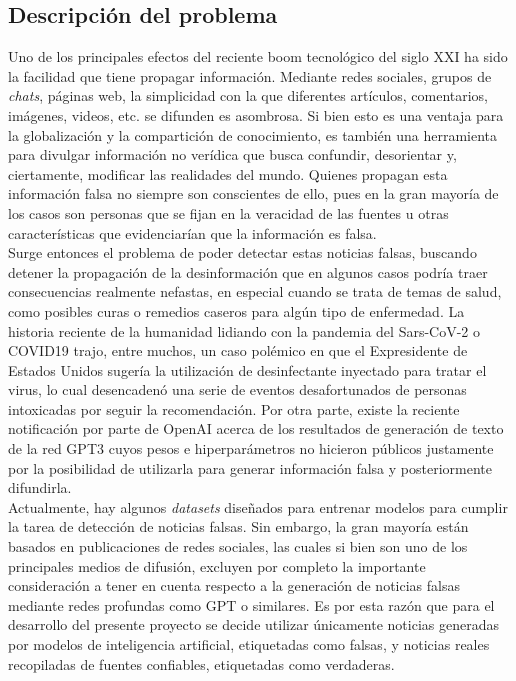 \subsection{Descripción del problema}
Uno de los principales efectos del reciente boom tecnológico del siglo XXI ha sido la facilidad que tiene propagar información. Mediante redes sociales, grupos de \textit{chats}, páginas web, la simplicidad con la que diferentes artículos, comentarios, imágenes, videos, etc. se difunden es asombrosa. Si bien esto es una ventaja para la globalización y la compartición de conocimiento, es también una herramienta para divulgar información no verídica que busca confundir, desorientar y, ciertamente, modificar las realidades del mundo. Quienes propagan esta información falsa no siempre son conscientes de ello, pues en la gran mayoría de los casos son personas que se fijan en la veracidad de las fuentes u otras características que evidenciarían que la información es falsa.\\

Surge entonces el problema de poder detectar estas noticias falsas, buscando detener la propagación de la desinformación que en algunos casos podría traer consecuencias realmente nefastas, en especial cuando se trata de temas de salud, como posibles curas o remedios caseros para algún tipo de enfermedad. La historia reciente de la humanidad lidiando con la pandemia del Sars-CoV-2 o COVID19 trajo, entre muchos, un caso polémico en que el Expresidente de Estados Unidos sugería la utilización de desinfectante inyectado para tratar el virus, lo cual desencadenó una serie de eventos desafortunados de personas intoxicadas por seguir la recomendación. Por otra parte, existe la reciente notificación por parte de OpenAI acerca de los resultados de generación de texto de la red GPT3 cuyos pesos e hiperparámetros no hicieron públicos justamente por la posibilidad de utilizarla para generar información falsa y posteriormente difundirla.\\

Actualmente, hay algunos \textit{datasets} diseñados para entrenar modelos para cumplir la tarea de detección de noticias falsas. Sin embargo, la gran mayoría están basados en publicaciones de redes sociales, las cuales si bien son uno de los principales medios de difusión, excluyen por completo la importante consideración a tener en cuenta respecto a la generación de noticias falsas mediante redes profundas como GPT o similares. Es por esta razón que para el desarrollo del presente proyecto se decide utilizar únicamente noticias generadas por modelos de inteligencia artificial, etiquetadas como falsas, y noticias reales recopiladas de fuentes confiables, etiquetadas como verdaderas.\\

